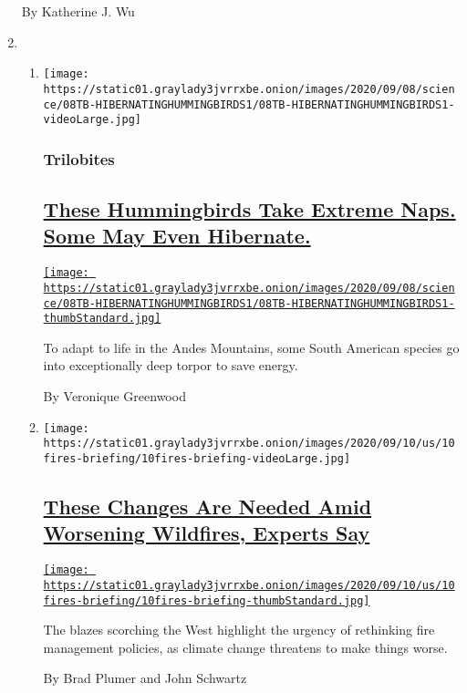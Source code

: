 \begin{enumerate}
  By Katherine J. Wu
\item
  \begin{enumerate}
  \def\labelenumii{\arabic{enumii}.}
  \item
    \texttt{[image: https://static01.graylady3jvrrxbe.onion/images/2020/09/08/science/08TB-HIBERNATINGHUMMINGBIRDS1/08TB-HIBERNATINGHUMMINGBIRDS1-videoLarge.jpg]}

    \hypertarget{trilobites}{%
    \subsubsection{Trilobites}\label{trilobites}}

    \hypertarget{these-hummingbirds-take-extreme-naps-some-may-even-hibernate}{%
    \subsection{\texorpdfstring{\href{/2020/09/08/science/hummingbirds-torpor-hibernation.html}{These
    Hummingbirds Take Extreme Naps. Some May Even
    Hibernate.}}{These Hummingbirds Take Extreme Naps. Some May Even Hibernate.}}\label{these-hummingbirds-take-extreme-naps-some-may-even-hibernate}}

    \href{/2020/09/08/science/hummingbirds-torpor-hibernation.html}{\texttt{[image: https://static01.graylady3jvrrxbe.onion/images/2020/09/08/science/08TB-HIBERNATINGHUMMINGBIRDS1/08TB-HIBERNATINGHUMMINGBIRDS1-thumbStandard.jpg]}}

    To adapt to life in the Andes Mountains, some South American species
    go into exceptionally deep torpor to save energy.

    By Veronique Greenwood
  \item
    \texttt{[image: https://static01.graylady3jvrrxbe.onion/images/2020/09/10/us/10fires-briefing/10fires-briefing-videoLarge.jpg]}

    \hypertarget{these-changes-are-needed-amid-worsening-wildfires-experts-say}{%
    \subsection{\texorpdfstring{\href{/2020/09/10/climate/wildfires-climate-policy.html}{These
    Changes Are Needed Amid Worsening Wildfires, Experts
    Say}}{These Changes Are Needed Amid Worsening Wildfires, Experts Say}}\label{these-changes-are-needed-amid-worsening-wildfires-experts-say}}

    \href{/2020/09/10/climate/wildfires-climate-policy.html}{\texttt{[image: https://static01.graylady3jvrrxbe.onion/images/2020/09/10/us/10fires-briefing/10fires-briefing-thumbStandard.jpg]}}

    The blazes scorching the West highlight the urgency of rethinking
    fire management policies, as climate change threatens to make things
    worse.

    By Brad Plumer and John Schwartz
  \end{enumerate}
\end{enumerate}

